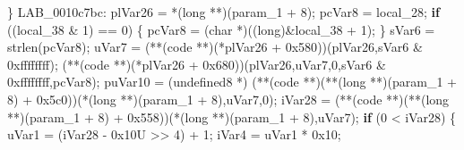 \documentclass[
]{article}
\newenvironment{Shaded}{}{}
\newcommand{\BaseNTok}[1]{\textcolor[rgb]{0.25,0.63,0.44}{#1}}
\newcommand{\BuiltInTok}[1]{\textcolor[rgb]{0.00,0.50,0.00}{#1}}
\newcommand{\ControlFlowTok}[1]{\textcolor[rgb]{0.00,0.44,0.13}{\textbf{#1}}}
\newcommand{\DataTypeTok}[1]{\textcolor[rgb]{0.56,0.13,0.00}{#1}}
\newcommand{\DecValTok}[1]{\textcolor[rgb]{0.25,0.63,0.44}{#1}}
\newcommand{\NormalTok}[1]{#1}
\newcommand{\OperatorTok}[1]{\textcolor[rgb]{0.40,0.40,0.40}{#1}}
\begin{document}
\begin{Shaded}
\begin{Highlighting}[]
  \OperatorTok{\}}
\NormalTok{LAB\_0010c7bc}\OperatorTok{:}
\NormalTok{  plVar26 }\OperatorTok{=} \OperatorTok{*(}\DataTypeTok{long} \OperatorTok{**)(}\NormalTok{param\_1 }\OperatorTok{+} \DecValTok{8}\OperatorTok{);}
\NormalTok{  pcVar8 }\OperatorTok{=}\NormalTok{ local\_28}\OperatorTok{;}
  \ControlFlowTok{if} \OperatorTok{((}\NormalTok{local\_38 }\OperatorTok{\&} \DecValTok{1}\OperatorTok{)} \OperatorTok{==} \DecValTok{0}\OperatorTok{)} \OperatorTok{\{}
\NormalTok{    pcVar8 }\OperatorTok{=} \OperatorTok{(}\DataTypeTok{char} \OperatorTok{*)((}\DataTypeTok{long}\OperatorTok{)\&}\NormalTok{local\_38 }\OperatorTok{+} \DecValTok{1}\OperatorTok{);}
  \OperatorTok{\}}
\NormalTok{  sVar6 }\OperatorTok{=}\NormalTok{ strlen}\OperatorTok{(}\NormalTok{pcVar8}\OperatorTok{);}
\NormalTok{  uVar7 }\OperatorTok{=} \OperatorTok{(**(}\NormalTok{code }\OperatorTok{**)(*}\NormalTok{plVar26 }\OperatorTok{+} \BaseNTok{0x580}\OperatorTok{))(}\NormalTok{plVar26}\OperatorTok{,}\NormalTok{sVar6 }\OperatorTok{\&} \BaseNTok{0xffffffff}\OperatorTok{);}
  \OperatorTok{(**(}\NormalTok{code }\OperatorTok{**)(*}\NormalTok{plVar26 }\OperatorTok{+} \BaseNTok{0x680}\OperatorTok{))(}\NormalTok{plVar26}\OperatorTok{,}\NormalTok{uVar7}\OperatorTok{,}\DecValTok{0}\OperatorTok{,}\NormalTok{sVar6 }\OperatorTok{\&} \BaseNTok{0xffffffff}\OperatorTok{,}\NormalTok{pcVar8}\OperatorTok{);}
\NormalTok{  puVar10 }\OperatorTok{=} \OperatorTok{(}\NormalTok{undefined8 }\OperatorTok{*)}
            \OperatorTok{(**(}\NormalTok{code }\OperatorTok{**)(**(}\DataTypeTok{long} \OperatorTok{**)(}\NormalTok{param\_1 }\OperatorTok{+} \DecValTok{8}\OperatorTok{)} \OperatorTok{+} \BaseNTok{0x5c0}\OperatorTok{))(*(}\DataTypeTok{long} \OperatorTok{**)(}\NormalTok{param\_1 }\OperatorTok{+} \DecValTok{8}\OperatorTok{),}\NormalTok{uVar7}\OperatorTok{,}\DecValTok{0}\OperatorTok{);}
\NormalTok{  iVar28 }\OperatorTok{=} \OperatorTok{(**(}\NormalTok{code }\OperatorTok{**)(**(}\DataTypeTok{long} \OperatorTok{**)(}\NormalTok{param\_1 }\OperatorTok{+} \DecValTok{8}\OperatorTok{)} \OperatorTok{+} \BaseNTok{0x558}\OperatorTok{))(*(}\DataTypeTok{long} \OperatorTok{**)(}\NormalTok{param\_1 }\OperatorTok{+} \DecValTok{8}\OperatorTok{),}\NormalTok{uVar7}\OperatorTok{);}
  \ControlFlowTok{if} \OperatorTok{(}\DecValTok{0} \OperatorTok{\textless{}}\NormalTok{ iVar28}\OperatorTok{)} \OperatorTok{\{}
\NormalTok{    uVar1 }\OperatorTok{=} \OperatorTok{(}\NormalTok{iVar28 }\OperatorTok{{-}} \BaseNTok{0x10}\BuiltInTok{U} \OperatorTok{\textgreater{}\textgreater{}} \DecValTok{4}\OperatorTok{)} \OperatorTok{+} \DecValTok{1}\OperatorTok{;}
\NormalTok{    iVar4 }\OperatorTok{=}\NormalTok{ uVar1 }\OperatorTok{*} \BaseNTok{0x10}\OperatorTok{;}

\end{Highlighting}
\end{Shaded}
\end{document}
